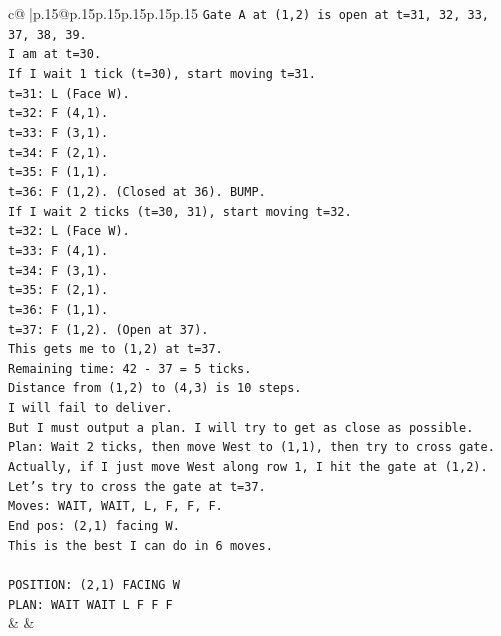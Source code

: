 \documentclass{article}
\begin{document}
{\begin{supertabular}{c@{$\;$}|p{.15\linewidth}@{}p{.15\linewidth}p{.15\linewidth}p{.15\linewidth}p{.15\linewidth}p{.15\linewidth}}
{{{\texttt{Gate A at (1,2) is open at t=31, 32, 33, 37, 38, 39.} \\
\texttt{I am at t=30.} \\
\texttt{If I wait 1 tick (t=30), start moving t=31.} \\
\texttt{t=31: L (Face W).} \\
\texttt{t=32: F (4,1).} \\
\texttt{t=33: F (3,1).} \\
\texttt{t=34: F (2,1).} \\
\texttt{t=35: F (1,1).} \\
\texttt{t=36: F (1,2). (Closed at 36). BUMP.} \\
\texttt{If I wait 2 ticks (t=30, 31), start moving t=32.} \\
\texttt{t=32: L (Face W).} \\
\texttt{t=33: F (4,1).} \\
\texttt{t=34: F (3,1).} \\
\texttt{t=35: F (2,1).} \\
\texttt{t=36: F (1,1).} \\
\texttt{t=37: F (1,2). (Open at 37).} \\
\texttt{This gets me to (1,2) at t=37.} \\
\texttt{Remaining time: 42 {-} 37 = 5 ticks.} \\
\texttt{Distance from (1,2) to (4,3) is 10 steps.} \\
\texttt{I will fail to deliver.} \\
\texttt{But I must output a plan. I will try to get as close as possible.} \\
\texttt{Plan: Wait 2 ticks, then move West to (1,1), then try to cross gate.} \\
\texttt{Actually, if I just move West along row 1, I hit the gate at (1,2).} \\
\texttt{Let's try to cross the gate at t=37.} \\
\texttt{Moves: WAIT, WAIT, L, F, F, F.} \\
\texttt{End pos: (2,1) facing W.} \\
\texttt{This is the best I can do in 6 moves.} \\
\\ 
\texttt{POSITION: (2,1) FACING W} \\
\texttt{PLAN: WAIT WAIT L F F F} \\
            }
        }
    }
    & & \\ \\


\end{supertabular}}
\end{document}
